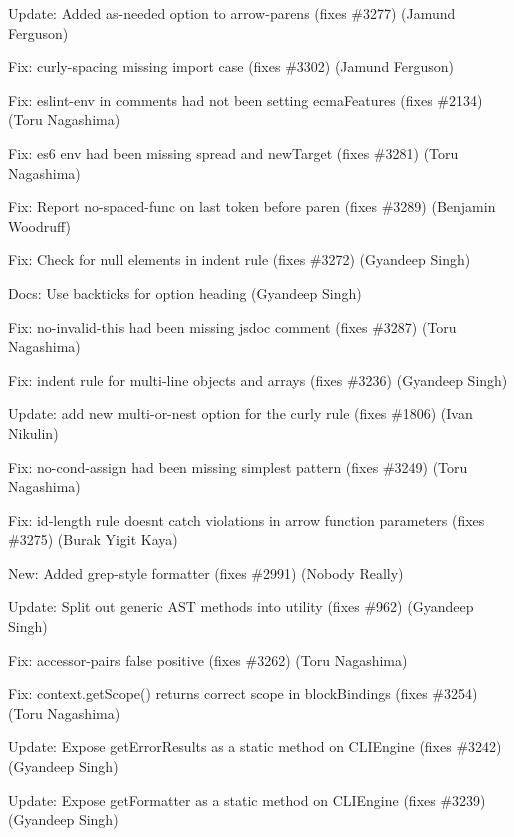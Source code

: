 \begin{DoxyItemize}
\item Update\+: Added as-\/needed option to arrow-\/parens (fixes \#3277) (Jamund Ferguson)
\item Fix\+: curly-\/spacing missing import case (fixes \#3302) (Jamund Ferguson)
\item Fix\+: {\ttfamily eslint-\/env} in comments had not been setting {\ttfamily ecma\+Features} (fixes \#2134) (Toru Nagashima)
\item Fix\+: {\ttfamily es6} env had been missing {\ttfamily spread} and {\ttfamily new\+Target} (fixes \#3281) (Toru Nagashima)
\item Fix\+: Report no-\/spaced-\/func on last token before paren (fixes \#3289) (Benjamin Woodruff)
\item Fix\+: Check for null elements in indent rule (fixes \#3272) (Gyandeep Singh)
\item Docs\+: Use backticks for option heading (Gyandeep Singh)
\item Fix\+: {\ttfamily no-\/invalid-\/this} had been missing jsdoc comment (fixes \#3287) (Toru Nagashima)
\item Fix\+: {\ttfamily indent} rule for multi-\/line objects and arrays (fixes \#3236) (Gyandeep Singh)
\item Update\+: add new {\ttfamily multi-\/or-\/nest} option for the {\ttfamily curly} rule (fixes \#1806) (Ivan Nikulin)
\item Fix\+: {\ttfamily no-\/cond-\/assign} had been missing simplest pattern (fixes \#3249) (Toru Nagashima)
\item Fix\+: id-\/length rule doesn\textquotesingle{}t catch violations in arrow function parameters (fixes \#3275) (Burak Yigit Kaya)
\item New\+: Added grep-\/style formatter (fixes \#2991) (Nobody Really)
\item Update\+: Split out generic A\+ST methods into utility (fixes \#962) (Gyandeep Singh)
\item Fix\+: {\ttfamily accessor-\/pairs} false positive (fixes \#3262) (Toru Nagashima)
\item Fix\+: {\ttfamily context.\+get\+Scope()} returns correct scope in block\+Bindings (fixes \#3254) (Toru Nagashima)
\item Update\+: Expose {\ttfamily get\+Error\+Results} as a static method on {\ttfamily C\+L\+I\+Engine} (fixes \#3242) (Gyandeep Singh)
\item Update\+: Expose {\ttfamily get\+Formatter} as a static method on {\ttfamily C\+L\+I\+Engine} (fixes \#3239) (Gyandeep Singh)

\end{DoxyItemize}
